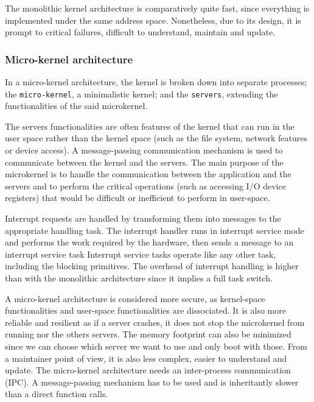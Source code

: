 The monolithic kernel architecture is comparatively quite fast, since ev\-ery\-thing is implemented under the same address space.
Nonetheless, due to its design, it is prompt to critical failures, difficult to understand, maintain and update.

\subsubsection{Micro-kernel architecture}
In a micro-kernel architecture, the kernel is broken down into separate processes;
     the \texttt{micro-kernel}, a minimalistic kernel;
     and the \texttt{servers}, extending the functionalities of the said microkernel.

The servers functionalities are often features of the kernel that can run in the user space
    rather than the kernel space (such as the file system, network features or device access).
A message-passing communication mechanism is used to communicate between the kernel and the servers.
The main purpose of the microkernel is to handle the communication between the application and the servers
    and to perform the critical operations (such as accessing I/O device registers) that would be difficult or inefficient to perform in user-space.

Interrupt requests are handled by transforming them into messages to the appropriate handling task.
The interrupt handler runs in interrupt service mode and performs the work required by the hardware, then sends a message to an interrupt service task
Interrupt service tasks operate like any other task, including the blocking primitives.
The overhead of interrupt handling is higher than with the monolithic architecture since it implies a full task switch.

A micro-kernel architecture is considered more secure, as kernel-space functionalities and user-space functionalities are dissociated.
It is also more reliable and resilient as if a server crashes, it does not stop the microkernel from running nor the others servers.
The memory footprint can also be minimized since we can choose which server we want to use and only boot with those.
From a maintainer point of view, it is also less complex, easier to understand and update.
The micro-kernel architecture needs an inter-process communication (IPC).
A message-passing mechanism has to be used and is inheritantly slower than a direct function calls.
\\

